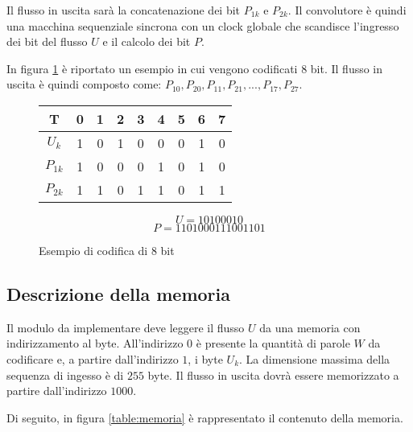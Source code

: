 Il flusso in uscita sarà la concatenazione dei bit $P_{1k}$ e $P_{2k}$. Il convolutore è quindi una macchina sequenziale sincrona con un clock globale che scandisce l'ingresso dei bit del flusso $U$ e il calcolo dei bit $P$.

\newpage

In figura \ref{table:esempio8bit} è riportato un esempio in cui vengono codificati 8 bit. Il flusso in uscita è quindi composto come: $P_{10},P_{20},P_{11},P_{21},...,P_{17},P_{27}$.

\begin{figure}[!ht]
    \centering
    \begin{minipage}{0.4\linewidth}
        \begin{tabular}{c | c | c | c | c | c | c | c | c}
            T        & 0 & 1 & 2 & 3 & 4 & 5 & 6 & 7 \\
            \hline
            $U_k$    & 1 & 0 & 1 & 0 & 0 & 0 & 1 & 0 \\
            $P_{1k}$ & 1 & 0 & 0 & 0 & 1 & 0 & 1 & 0 \\
            $P_{2k}$ & 1 & 1 & 0 & 1 & 1 & 0 & 1 & 1 \\
        \end{tabular}
    \end{minipage}
    \begin{minipage}{0.4\linewidth}
        \begin{equation*}
            U = 10100010
        \end{equation*}
        \begin{equation*}
            P = 1101000111001101
        \end{equation*}
    \end{minipage}
    \caption{Esempio di codifica di 8 bit}
    \label{table:esempio8bit}
\end{figure}

\subsection{Descrizione della memoria}

Il modulo da implementare deve leggere il flusso $U$ da una memoria con indirizzamento al byte. All'indirizzo $0$ è presente la quantità di parole $W$ da codificare e, a partire dall'indirizzo $1$, i byte $U_k$. La dimensione massima della sequenza di ingesso è di $255$ byte. Il flusso in uscita dovrà essere memorizzato a partire dall'indirizzo $1000$.

Di seguito, in figura \ref{table:memoria} è rappresentato il contenuto della memoria.


